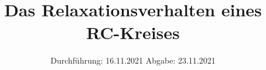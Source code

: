 

\subject{V353}
\title{Das Relaxationsverhalten eines RC-Kreises}
\date{%
  Durchführung: 16.11.2021
  \hspace{3em}
  Abgabe: 23.11.2021
}



\maketitle
\thispagestyle{empty}
\tableofcontents
\newpage





\printbibliography{}
\appendix


